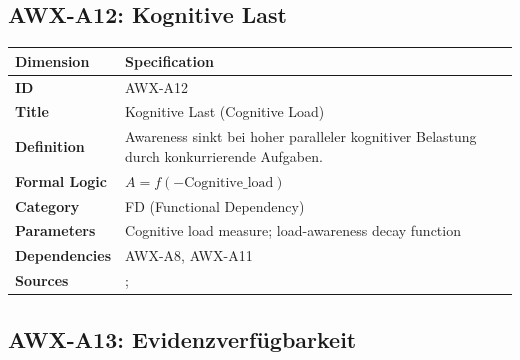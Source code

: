 
\subsection{AWX-A12: Kognitive Last}

\begin{table}[htbp]
\small
\begin{tabular}{p{3cm}p{11cm}}
\toprule
\textbf{Dimension} & \textbf{Specification} \\
\midrule
\textbf{ID} & AWX-A12 \\
\textbf{Title} & Kognitive Last (Cognitive Load) \\
\textbf{Definition} & Awareness sinkt bei hoher paralleler kognitiver Belastung durch konkurrierende Aufgaben. \\
\textbf{Formal Logic} & $A = f(-\text{Cognitive\_load})$ \\
\textbf{Category} & FD (Functional Dependency) \\
\textbf{Parameters} & Cognitive load measure; load-awareness decay function \\
\textbf{Dependencies} & AWX-A8, AWX-A11 \\
\textbf{Sources} & \citet{sweller1988cognitive}; \citet{lavie2005distracted} \\
\bottomrule
\end{tabular}
\end{table}


\subsection{AWX-A13: Evidenzverfügbarkeit}

